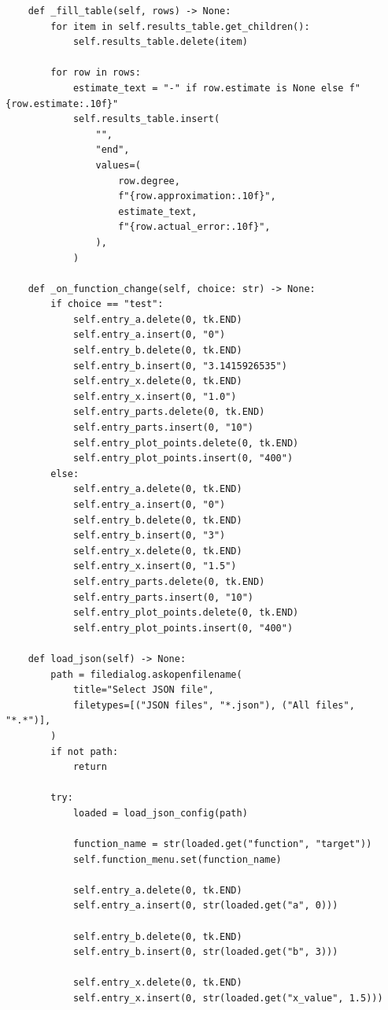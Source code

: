 \documentclass[12pt,a4paper]{article}
\begin{document}
\begin{verbatim}
    def _fill_table(self, rows) -> None:
        for item in self.results_table.get_children():
            self.results_table.delete(item)

        for row in rows:
            estimate_text = "-" if row.estimate is None else f"{row.estimate:.10f}"
            self.results_table.insert(
                "",
                "end",
                values=(
                    row.degree,
                    f"{row.approximation:.10f}",
                    estimate_text,
                    f"{row.actual_error:.10f}",
                ),
            )

    def _on_function_change(self, choice: str) -> None:
        if choice == "test":
            self.entry_a.delete(0, tk.END)
            self.entry_a.insert(0, "0")
            self.entry_b.delete(0, tk.END)
            self.entry_b.insert(0, "3.1415926535")
            self.entry_x.delete(0, tk.END)
            self.entry_x.insert(0, "1.0")
            self.entry_parts.delete(0, tk.END)
            self.entry_parts.insert(0, "10")
            self.entry_plot_points.delete(0, tk.END)
            self.entry_plot_points.insert(0, "400")
        else:
            self.entry_a.delete(0, tk.END)
            self.entry_a.insert(0, "0")
            self.entry_b.delete(0, tk.END)
            self.entry_b.insert(0, "3")
            self.entry_x.delete(0, tk.END)
            self.entry_x.insert(0, "1.5")
            self.entry_parts.delete(0, tk.END)
            self.entry_parts.insert(0, "10")
            self.entry_plot_points.delete(0, tk.END)
            self.entry_plot_points.insert(0, "400")

    def load_json(self) -> None:
        path = filedialog.askopenfilename(
            title="Select JSON file",
            filetypes=[("JSON files", "*.json"), ("All files", "*.*")],
        )
        if not path:
            return

        try:
            loaded = load_json_config(path)

            function_name = str(loaded.get("function", "target"))
            self.function_menu.set(function_name)

            self.entry_a.delete(0, tk.END)
            self.entry_a.insert(0, str(loaded.get("a", 0)))

            self.entry_b.delete(0, tk.END)
            self.entry_b.insert(0, str(loaded.get("b", 3)))

            self.entry_x.delete(0, tk.END)
            self.entry_x.insert(0, str(loaded.get("x_value", 1.5)))


\end{verbatim}
\end{document}
